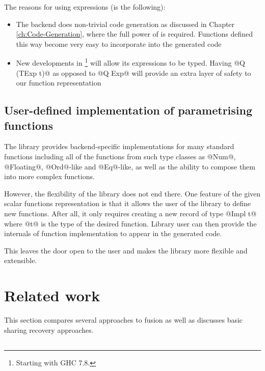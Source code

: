 \documentclass[preamble.tex]{subfiles}
\begin{document}
The reasons for using  expressions (is the following):
\begin{itemize}
\item The backend does non-trivial code generation as discussed in Chapter \ref{ch:Code-Generation}, where the full power of  is required. Functions defined this way become very easy to incorporate into the generated code
\item New developments in \footnote{Starting with GHC 7.8.} will allow its expressions to be typed. Having @Q (TExp t)@ as opposed to @Q Exp@ will provide an extra layer of safety to our function representation
\end{itemize}


\subsection{User-defined implementation of parametrising functions}

The library provides backend-specific implementations for many standard functions including all of the functions from such type classes as @Num@, @Floating@, @Ord@-like and @Eq@-like, as well as the ability to compose them into more complex functions.

However, the flexibility of the library does not end there. One feature of the given scalar functions representation is that it allows the user of the library to define new functions. After all, it only requires creating a new record of type @Impl t@ where @t@ is the type of the desired function. Library user can then provide the internals of function implementation to appear in the generated code.

This leaves the door open to the user and makes the library more flexible and extensible.


\clearpage
\section{Related work}

This section compares several approaches to fusion as well as discusses basic sharing recovery approaches.


\subsection{}
\label{sec:DESOLA}
\end{document}
